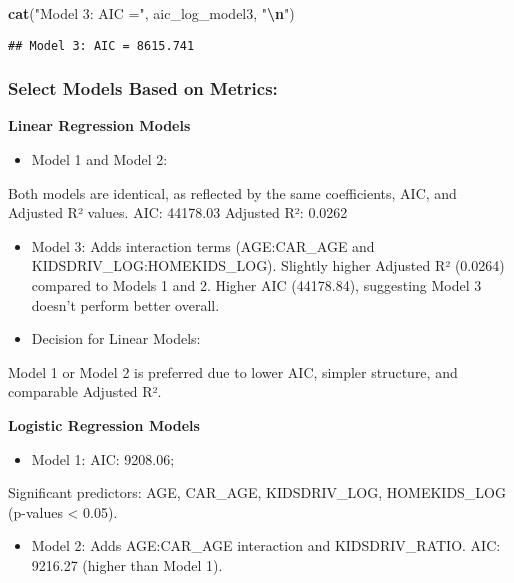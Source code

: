 \documentclass[
]{article}
\newenvironment{Shaded}{\begin{snugshade}}{\end{snugshade}}
\newcommand{\FunctionTok}[1]{\textcolor[rgb]{0.13,0.29,0.53}{\textbf{#1}}}
\newcommand{\NormalTok}[1]{#1}
\newcommand{\SpecialCharTok}[1]{\textcolor[rgb]{0.81,0.36,0.00}{\textbf{#1}}}
\newcommand{\StringTok}[1]{\textcolor[rgb]{0.31,0.60,0.02}{#1}}
\providecommand{\tightlist}{%
  \setlength{\itemsep}{0pt}\setlength{\parskip}{0pt}}
\begin{document}
\begin{Shaded}
\begin{Highlighting}[]
\FunctionTok{cat}\NormalTok{(}\StringTok{"Model 3: AIC ="}\NormalTok{, aic\_log\_model3, }\StringTok{"}\SpecialCharTok{\textbackslash{}n}\StringTok{"}\NormalTok{)}
\end{Highlighting}
\end{Shaded}

\begin{verbatim}
## Model 3: AIC = 8615.741
\end{verbatim}

\subsubsection{Select Models Based on
Metrics:}\label{select-models-based-on-metrics}

\textbf{Linear Regression Models}

\begin{itemize}
\tightlist
\item
  Model 1 and Model 2:
\end{itemize}

Both models are identical, as reflected by the same coefficients, AIC,
and Adjusted R² values. AIC: 44178.03 Adjusted R²: 0.0262

\begin{itemize}
\item
  Model 3: Adds interaction terms (AGE:CAR\_AGE and
  KIDSDRIV\_LOG:HOMEKIDS\_LOG). Slightly higher Adjusted R² (0.0264)
  compared to Models 1 and 2. Higher AIC (44178.84), suggesting Model 3
  doesn't perform better overall.
\item
  Decision for Linear Models:
\end{itemize}

Model 1 or Model 2 is preferred due to lower AIC, simpler structure, and
comparable Adjusted R².

\textbf{Logistic Regression Models}

\begin{itemize}
\tightlist
\item
  Model 1: AIC: 9208.06;
\end{itemize}

Significant predictors: AGE, CAR\_AGE, KIDSDRIV\_LOG, HOMEKIDS\_LOG
(p-values \textless{} 0.05).

\begin{itemize}
\tightlist
\item
  Model 2: Adds AGE:CAR\_AGE interaction and KIDSDRIV\_RATIO. AIC:
  9216.27 (higher than Model 1).
\end{itemize}
\end{document}
